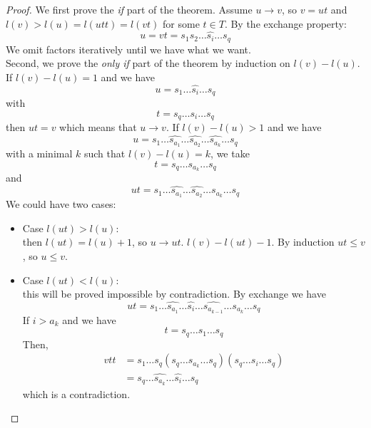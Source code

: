 \begin{proof}
We first prove the \emph{if} part of the theorem. Assume $u \to v$, so $v = ut$ and $l(v) > l(u) = l(utt) = l(vt)$ for some $t \in T$.
By the exchange property:
\begin{equation}
u = vt = s_1s_2\dots \hat{s_i} \dots s_q
\end{equation}
We omit factors iteratively until we have what we want.\\
Second, we prove the \emph{only if} part of the theorem by induction on $l(v) - l(u)$.
If $l(v)-l(u) = 1$ and we have
\begin{equation}
  u = s_1 \dots \hat{s_i} \dots s_q
\end{equation}
with
\begin{equation}
  t = s_q \dots s_i \dots s_q
\end{equation} then $ut = v$ which means that $u \to v$.
If $l(v) - l(u) > 1$ and we have
\begin{equation}
  u = s_1 \dots \hat{s_{a_1}} \dots \hat{s_{a_2}} \dots \hat{s_{a_k}} \dots s_q
\end{equation}
with a minimal $k$ such that $l(v) - l(u) = k$, we take
\begin{equation}
  t = s_q \dots s_{a_k} \dots s_q
\end{equation}
and
\begin{equation}
  ut = s_1 \dots \hat{s_{a_1}} \dots \hat{s_{a_2}} \dots s_{a_k} \dots s_q
\end{equation}
We could have two cases:
\begin{itemize}
  \item Case $l(ut) > l(u)$: \\
  then $l(ut) = l(u) +1$, so $u \to ut$. $l(v)-l(ut) -1$. By induction $ut \leq v$, so $u \leq v$.
  \item Case $l(ut) < l(u)$: \\
 this will be proved impossible by contradiction. By exchange we have
  \begin{equation}
    ut = s_1 \dots \hat{s_{a_1}} \dots \hat{s_{i}} \dots \hat{s_{a_{k-1}}} \dots s_{a_{k}} \dots s_q
  \end{equation}
  If $i > a_k$ and we have
  \begin{equation}
    t = s_q \dots s_1 \dots s_q
  \end{equation}
Then,
  \begin{equation}
    \begin{split}
      vtt &= s_1 \dots s_q (s_q \dots s_{a_k} \dots s_q)(s_q \dots s_i \dots s_q)\\
      &= s_q \dots \hat{s_{a_k}} \dots \hat{s_i} \dots s_q
    \end{split}
  \end{equation}
  which is a contradiction.\\


\end{itemize}
\end{proof}
